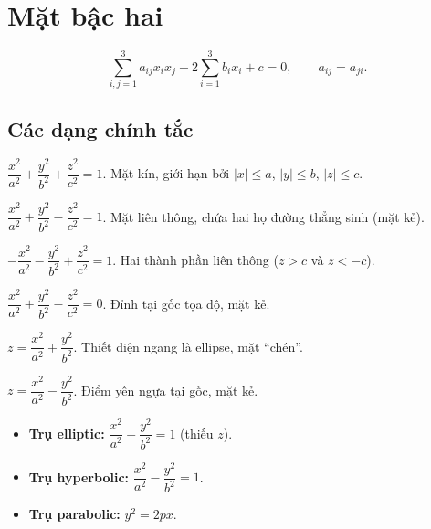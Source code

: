 \documentclass[12pt,a4paper]{article}
\begin{document}
\section{Mặt bậc hai}

\begin{dinhnghia}[title={Phương trình mặt bậc hai tổng quát}]
  \[
    \sum_{i,j=1}^{3} a_{ij} x_i x_j + 2\sum_{i=1}^{3} b_i x_i + c = 0, \qquad a_{ij} = a_{ji}.
  \]
\end{dinhnghia}

\subsection{Các dạng chính tắc}

\begin{congthuc}[title={Ellipsoid}]
  $\dfrac{x^2}{a^2} + \dfrac{y^2}{b^2} + \dfrac{z^2}{c^2} = 1$. \quad Mặt kín, giới hạn bởi $|x| \le a$, $|y| \le b$, $|z| \le c$.
\end{congthuc}

\begin{congthuc}[title={Hyperboloid một tầng}]
  $\dfrac{x^2}{a^2} + \dfrac{y^2}{b^2} - \dfrac{z^2}{c^2} = 1$. \quad Mặt liên thông, chứa hai họ đường thẳng sinh (mặt kẻ).
\end{congthuc}

\begin{congthuc}[title={Hyperboloid hai tầng}]
  $-\dfrac{x^2}{a^2} - \dfrac{y^2}{b^2} + \dfrac{z^2}{c^2} = 1$. \quad Hai thành phần liên thông ($z > c$ và $z < -c$).
\end{congthuc}

\begin{congthuc}[title={Mặt nón bậc hai}]
  $\dfrac{x^2}{a^2} + \dfrac{y^2}{b^2} - \dfrac{z^2}{c^2} = 0$. \quad Đỉnh tại gốc tọa độ, mặt kẻ.
\end{congthuc}

\begin{congthuc}[title={Paraboloid elliptic}]
  $z = \dfrac{x^2}{a^2} + \dfrac{y^2}{b^2}$. \quad Thiết diện ngang là ellipse, mặt ``chén''.
\end{congthuc}

\begin{congthuc}[title={Paraboloid hyperbolic (yên ngựa)}]
  $z = \dfrac{x^2}{a^2} - \dfrac{y^2}{b^2}$. \quad Điểm yên ngựa tại gốc, mặt kẻ.
\end{congthuc}

\begin{congthuc}[title={Mặt trụ bậc hai}]
  \begin{itemize}
    \item \textbf{Trụ elliptic:} $\dfrac{x^2}{a^2} + \dfrac{y^2}{b^2} = 1$ (thiếu $z$).
    \item \textbf{Trụ hyperbolic:} $\dfrac{x^2}{a^2} - \dfrac{y^2}{b^2} = 1$.
    \item \textbf{Trụ parabolic:} $y^2 = 2px$.
  \end{itemize}
\end{congthuc}
\end{document}
